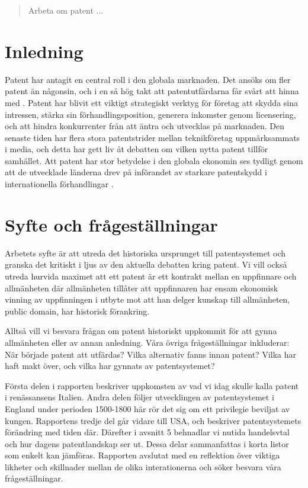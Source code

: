 
\begin{abstract}
	Arbeta om patent ...
\end{abstract}	
	
	
\section{Inledning}

Patent har antagit en central roll i den globala marknaden.
Det ansöks om fler patent än någonsin, och i en så hög takt att patentutfärdarna
får svårt att hinna med \cite{uspto_number}.
Patent har blivit ett viktigt strategiskt verktyg för företag att skydda sina
intressen, stärka sin förhandlingsposition, generera inkomster genom
licensering, och att hindra konkurrenter från att äntra och utvecklas på
marknaden. 
Den senaste tiden har flera stora patentstrider mellan teknikföretag
uppmärksammats i media, och detta har gett liv åt debatten om vilken nytta
patent tillför samhället.
Att patent har stor betydelse i den globala ekonomin ses tydligt genom att
de utvecklade länderna drev på införandet av starkare patentskydd i
internationella förhandlingar \cite{}. 



\section{Syfte och frågeställningar}

Arbetets syfte är att utreda det historiska ursprunget till patentsystemet och
granska det kritiskt i ljus av den aktuella debatten kring patent.
Vi vill också utreda hurvida maximet att ett patent är ett kontrakt mellan en
uppfinnare och allmänheten där allmänheten tillåter att uppfinnaren har ensam
ekonomisk vinning av uppfinningen i utbyte mot att han delger kunskap till
allmänheten, public domain, har historisk förankring.

Alltså vill vi besvara frågan om patent historiskt uppkommit för att gynna
allmänheten eller av annan anledning. Våra övriga frågeställningar inkluderar:
När började patent att utfärdas? Vilka alternativ fanns innan patent?
Vilka har haft makt över, och vilka har gynnats av patentsystemet?

Första delen i rapporten beskriver
uppkomsten av vad vi idag skulle kalla patent i renässansens Italien.
Andra delen följer utvecklingen av patentsystemet i England under perioden
1500-1800 här rör det sig om ett privilegie beviljat av kungen. Rapportens tredje del går vidare till USA, och beskriver patentsystemets förändring med tiden där. Därefter i avsnitt 5 behnadlar vi nutida handelsvtal och hur dagens patentlandskap ser ut. Dessa delar sammanfattas i korta listor som enkelt kan jämföras. Rapporten avslutat med en reflektion över viktiga likheter och skillnader mellan de olika interationerna och söker besvara våra frågeställningar. 
 
